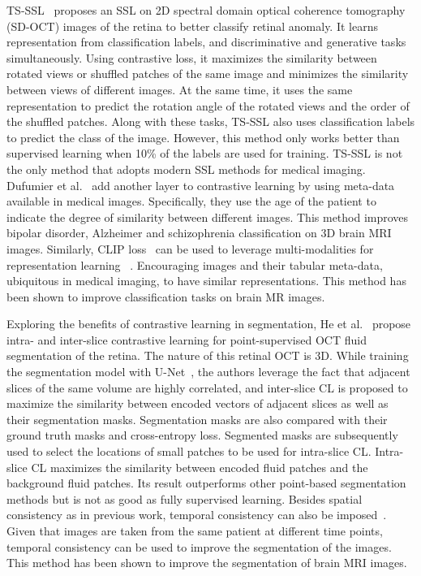 \documentclass[a4paper,11pt,oneside]{report}
\begin{document}
TS-SSL~\cite{Zhang2021} proposes an SSL on 2D spectral domain optical coherence tomography (SD-OCT) images of the retina to better classify retinal anomaly. It learns representation from classification labels, and discriminative and generative tasks simultaneously. Using contrastive loss, it maximizes the similarity between rotated views or shuffled patches of the same image and minimizes the similarity between views of different images. At the same time, it uses the same representation to predict the rotation angle of the rotated views and the order of the shuffled patches. Along with these tasks, TS-SSL also uses classification labels to predict the class of the image. However, this method only works better than supervised learning when 10\% of the labels are used for training. TS-SSL is not the only method that adopts modern SSL methods for medical imaging. Dufumier et al.~\cite{Dufumier2021} add another layer to contrastive learning by using meta-data available in medical images. Specifically, they use the age of the patient to indicate the degree of similarity between different images. This method improves bipolar disorder, Alzheimer and schizophrenia classification on 3D brain MRI images. Similarly, CLIP loss~\cite{Radford2021CLIP} can be used to leverage multi-modalities for representation learning ~\cite{Hager2023}. Encouraging images and their tabular meta-data, ubiquitous in medical imaging, to have similar representations. This method has been shown to improve classification tasks on brain MR images. 

Exploring the benefits of contrastive learning in segmentation, He et al.~\cite{He2022Intra} propose intra- and inter-slice contrastive learning for point-supervised OCT fluid segmentation of the retina. The nature of this retinal OCT is 3D. While training the segmentation model with U-Net~\cite{Ronneberger2015}, the authors leverage the fact that adjacent slices of the same volume are highly correlated, and inter-slice CL is proposed to maximize the similarity between encoded vectors of adjacent slices as well as their segmentation masks. Segmentation masks are also compared with their ground truth masks and cross-entropy loss. Segmented masks are subsequently used to select the locations of small patches to be used for intra-slice CL. Intra-slice CL maximizes the similarity between encoded fluid patches and the background fluid patches. Its result outperforms other point-based segmentation methods but is not as good as fully supervised learning. Besides spatial consistency as in previous work, temporal consistency can also be imposed~\cite{Ren2022}. Given that images are taken from the same patient at different time points, temporal consistency can be used to improve the segmentation of the images. This method has been shown to improve the segmentation of brain MRI images.
\end{document}
